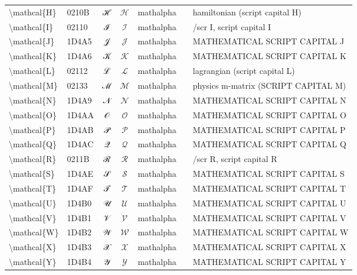 \documentclass[a4paper,landscape]{article}
\begin{document}
\begin{longtable}{llcclll}
\textbackslash{}mathcal\{H\} & 0210B & ℋ & $\mathcal{H}$ & mathalpha &  & hamiltonian (script capital H) \\
\textbackslash{}mathcal\{I\} & 02110 & ℐ & $\mathcal{I}$ & mathalpha &  & /scr I, script capital I \\
\textbackslash{}mathcal\{J\} & 1D4A5 & 𝒥 & $\mathcal{J}$ & mathalpha &  & MATHEMATICAL SCRIPT CAPITAL J \\
\textbackslash{}mathcal\{K\} & 1D4A6 & 𝒦 & $\mathcal{K}$ & mathalpha &  & MATHEMATICAL SCRIPT CAPITAL K \\
\textbackslash{}mathcal\{L\} & 02112 & ℒ & $\mathcal{L}$ & mathalpha &  & lagrangian (script capital L) \\
\textbackslash{}mathcal\{M\} & 02133 & ℳ & $\mathcal{M}$ & mathalpha &  & physics m-matrix (SCRIPT CAPITAL M) \\
\textbackslash{}mathcal\{N\} & 1D4A9 & 𝒩 & $\mathcal{N}$ & mathalpha &  & MATHEMATICAL SCRIPT CAPITAL N \\
\textbackslash{}mathcal\{O\} & 1D4AA & 𝒪 & $\mathcal{O}$ & mathalpha &  & MATHEMATICAL SCRIPT CAPITAL O \\
\textbackslash{}mathcal\{P\} & 1D4AB & 𝒫 & $\mathcal{P}$ & mathalpha &  & MATHEMATICAL SCRIPT CAPITAL P \\
\textbackslash{}mathcal\{Q\} & 1D4AC & 𝒬 & $\mathcal{Q}$ & mathalpha &  & MATHEMATICAL SCRIPT CAPITAL Q \\
\textbackslash{}mathcal\{R\} & 0211B & ℛ & $\mathcal{R}$ & mathalpha &  & /scr R, script capital R \\
\textbackslash{}mathcal\{S\} & 1D4AE & 𝒮 & $\mathcal{S}$ & mathalpha &  & MATHEMATICAL SCRIPT CAPITAL S \\
\textbackslash{}mathcal\{T\} & 1D4AF & 𝒯 & $\mathcal{T}$ & mathalpha &  & MATHEMATICAL SCRIPT CAPITAL T \\
\textbackslash{}mathcal\{U\} & 1D4B0 & 𝒰 & $\mathcal{U}$ & mathalpha &  & MATHEMATICAL SCRIPT CAPITAL U \\
\textbackslash{}mathcal\{V\} & 1D4B1 & 𝒱 & $\mathcal{V}$ & mathalpha &  & MATHEMATICAL SCRIPT CAPITAL V \\
\textbackslash{}mathcal\{W\} & 1D4B2 & 𝒲 & $\mathcal{W}$ & mathalpha &  & MATHEMATICAL SCRIPT CAPITAL W \\
\textbackslash{}mathcal\{X\} & 1D4B3 & 𝒳 & $\mathcal{X}$ & mathalpha &  & MATHEMATICAL SCRIPT CAPITAL X \\
\textbackslash{}mathcal\{Y\} & 1D4B4 & 𝒴 & $\mathcal{Y}$ & mathalpha &  & MATHEMATICAL SCRIPT CAPITAL Y \\

\end{longtable}
\end{document}
